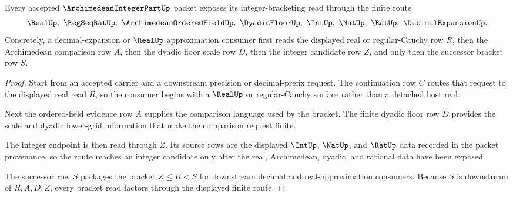 \begin{theorem}
\label{thm:archimedean-integer-part-bracket-route}
Every accepted $\ArchimedeanIntegerPartUp$ packet exposes its integer-bracketing read through the finite route
$$
\RealUp,\ \RegSeqRatUp,\ \ArchimedeanOrderedFieldUp,\ \DyadicFloorUp,\ \IntUp,\ \NatUp,\ \RatUp,\ \DecimalExpansionUp .
$$
Concretely, a decimal-expansion or $\RealUp$ approximation consumer first reads the displayed real or regular-Cauchy row $R$, then the Archimedean comparison row $A$, then the dyadic floor scale row $D$, then the integer candidate row $Z$, and only then the successor bracket row $S$.
\end{theorem}
\begin{proof}
Start from an accepted carrier and a downstream precision or decimal-prefix request. The continuation row $C$ routes that request to the displayed real read $R$, so the consumer begins with a $\RealUp$ or regular-Cauchy surface rather than a detached host real.

Next the ordered-field evidence row $A$ supplies the comparison language used by the bracket. The finite dyadic floor row $D$ provides the scale and dyadic lower-grid information that make the comparison request finite.

The integer endpoint is then read through $Z$. Its source rows are the displayed $\IntUp$, $\NatUp$, and $\RatUp$ data recorded in the packet provenance, so the route reaches an integer candidate only after the real, Archimedean, dyadic, and rational data have been exposed.

The successor row $S$ packages the bracket $Z\leq R<S$ for downstream decimal and real-approximation consumers. Because $S$ is downstream of $R,A,D,Z$, every bracket read factors through the displayed finite route.
\end{proof}

